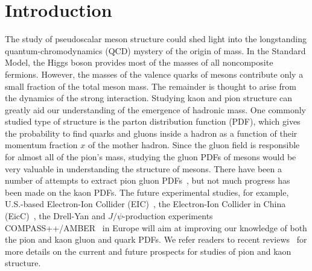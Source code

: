 \section{Introduction}\label{sec:intro}

The study of pseudoscalar meson structure could shed light into the longstanding quantum-chromodynamics (QCD) mystery of the origin of mass.
In the Standard Model, the Higgs boson provides most of the masses of all noncomposite fermions.
However, the masses of the valence quarks of mesons contribute only a small fraction of the total meson mass.
The remainder is thought to arise from the dynamics of the strong interaction.
Studying kaon and pion structure can greatly aid our understanding of the emergence of hadronic mass.
One commonly studied type of structure is the parton distribution function (PDF), which gives the probability to find quarks and gluons inside a hadron as a function of their momentum fraction $x$ of the mother hadron.
Since the gluon field is responsible for almost all of the pion's mass, studying the gluon PDFs of mesons would be very valuable in understanding the structure of mesons.
There have been a number of attempts to extract pion gluon PDFs~\cite{Barry:2018ort,Cao:2021aci,Novikov:2020snp,Chang:2020rdy}, but not much progress has been made on the kaon PDFs.
The future experimental studies, for example, U.S.-based Electron-Ion Collider (EIC)~\cite{Accardi:2012qut,AbdulKhalek:2021gbh}, the Electron-Ion Collider in China (EicC)~\cite{Anderle:2021wcy},
the Drell-Yan and $J/\psi$-production experiments  COMPASS++/AMBER~\cite{Denisov:2018unj} in Europe  will aim at improving our knowledge of both the pion and kaon gluon and quark PDFs.
We refer readers to recent reviews~\cite{Aguilar:2019teb,Roberts:2021nhw,Arrington:2021biu} for more details on the current and future prospects for studies of pion and kaon structure.


